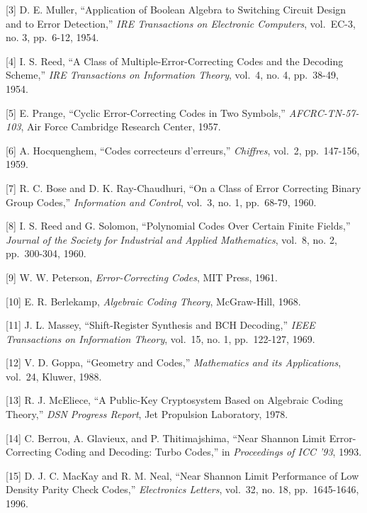 \documentclass[11pt,oneside]{book}
\theoremstyle{plain}
\theoremstyle{definition}
\theoremstyle{remark}
\begin{document}
{[}3{]} D. E. Muller, ``Application of Boolean Algebra to Switching
Circuit Design and to Error Detection,'' \emph{IRE Transactions on
Electronic Computers}, vol.~EC-3, no. 3, pp.~6-12, 1954.

{[}4{]} I. S. Reed, ``A Class of Multiple-Error-Correcting Codes and the
Decoding Scheme,'' \emph{IRE Transactions on Information Theory},
vol.~4, no. 4, pp.~38-49, 1954.

{[}5{]} E. Prange, ``Cyclic Error-Correcting Codes in Two Symbols,''
\emph{AFCRC-TN-57-103}, Air Force Cambridge Research Center, 1957.

{[}6{]} A. Hocquenghem, ``Codes correcteurs d'erreurs,''
\emph{Chiffres}, vol.~2, pp.~147-156, 1959.

{[}7{]} R. C. Bose and D. K. Ray-Chaudhuri, ``On a Class of Error
Correcting Binary Group Codes,'' \emph{Information and Control}, vol.~3,
no. 1, pp.~68-79, 1960.

{[}8{]} I. S. Reed and G. Solomon, ``Polynomial Codes Over Certain
Finite Fields,'' \emph{Journal of the Society for Industrial and Applied
Mathematics}, vol.~8, no. 2, pp.~300-304, 1960.

{[}9{]} W. W. Peterson, \emph{Error-Correcting Codes}, MIT Press, 1961.

{[}10{]} E. R. Berlekamp, \emph{Algebraic Coding Theory}, McGraw-Hill,
1968.

{[}11{]} J. L. Massey, ``Shift-Register Synthesis and BCH Decoding,''
\emph{IEEE Transactions on Information Theory}, vol.~15, no. 1,
pp.~122-127, 1969.

{[}12{]} V. D. Goppa, ``Geometry and Codes,'' \emph{Mathematics and its
Applications}, vol.~24, Kluwer, 1988.

{[}13{]} R. J. McEliece, ``A Public-Key Cryptosystem Based on Algebraic
Coding Theory,'' \emph{DSN Progress Report}, Jet Propulsion Laboratory,
1978.

{[}14{]} C. Berrou, A. Glavieux, and P. Thitimajshima, ``Near Shannon
Limit Error-Correcting Coding and Decoding: Turbo Codes,'' in
\emph{Proceedings of ICC '93}, 1993.

{[}15{]} D. J. C. MacKay and R. M. Neal, ``Near Shannon Limit
Performance of Low Density Parity Check Codes,'' \emph{Electronics
Letters}, vol.~32, no. 18, pp.~1645-1646, 1996.
\end{document}
